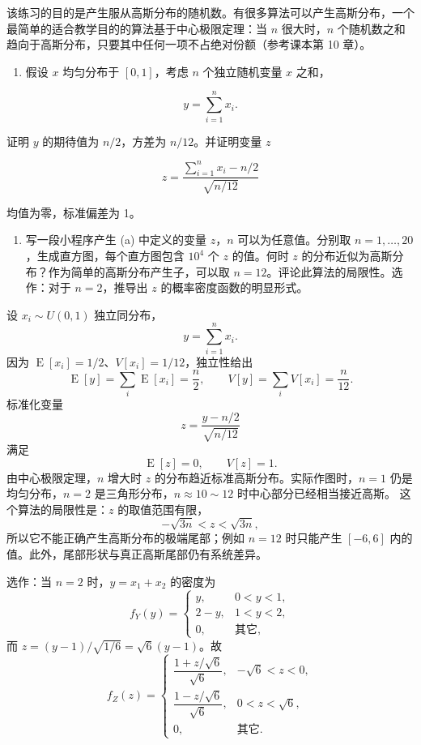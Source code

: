 \begin{question}
该练习的目的是产生服从高斯分布的随机数。有很多算法可以产生高斯分布，一个最简单的适合教学目的的算法基于中心极限定理：当
\(n\) 很大时，\(n\)
个随机数之和趋向于高斯分布，只要其中任何一项不占绝对份额（参考课本第 10
章）。

\begin{enumerate}
\item
  假设 \(x\) 均匀分布于 \([0,1]\)，考虑 \(n\) 个独立随机变量 \(x\)
  之和，
\end{enumerate}

\[
y=\sum_{i=1}^{n}x_i.
\]

证明 \(y\) 的期待值为 \(n/2\)，方差为 \(n/12\)。并证明变量 \(z\)

\[
z=\frac{\sum_{i=1}^{n}x_i-n/2}{\sqrt{n/12}}
\]

均值为零，标准偏差为 1。

\begin{enumerate}[start=2]
\item
  写一段小程序产生 (a) 中定义的变量 \(z\)，\(n\) 可以为任意值。分别取
  \(n=1,\ldots,20\)，生成直方图，每个直方图包含 \(10^4\) 个 \(z\)
  的值。何时 \(z\)
  的分布近似为高斯分布？作为简单的高斯分布产生子，可以取
  \(n=12\)。评论此算法的局限性。选作：对于 \(n=2\)，推导出 \(z\)
  的概率密度函数的明显形式。
\end{enumerate}
\begin{solution}
设 \(x_i\sim U(0,1)\) 独立同分布，
\[
y=\sum_{i=1}^n x_i.
\]
因为 \(\operatorname{E}[x_i]=1/2\)、\(V[x_i]=1/12\)，独立性给出
\[
\operatorname{E}[y]=\sum_i \operatorname{E}[x_i]=\frac n2,
\qquad
V[y]=\sum_i V[x_i]=\frac n{12}.
\]
标准化变量
\[
z=\frac{y-n/2}{\sqrt{n/12}}
\]
满足
\[
\operatorname{E}[z]=0,
\qquad
V[z]=1.
\]
由中心极限定理，\(n\) 增大时 \(z\) 的分布趋近标准高斯分布。实际作图时，\(n=1\)
仍是均匀分布，\(n=2\) 是三角形分布，\(n\approx 10\sim12\) 时中心部分已经相当接近高斯。
这个算法的局限性是：\(z\) 的取值范围有限，
\[
-\sqrt{3n}<z<\sqrt{3n},
\]
所以它不能正确产生高斯分布的极端尾部；例如 \(n=12\) 时只能产生 \([-6,6]\)
内的值。此外，尾部形状与真正高斯尾部仍有系统差异。

选作：当 \(n=2\) 时，\(y=x_1+x_2\) 的密度为
\[
f_Y(y)=
\begin{cases}
y,&0<y<1,\\
2-y,&1<y<2,\\
0,&\text{其它},
\end{cases}
\]
而 \(z=(y-1)/\sqrt{1/6}=\sqrt6(y-1)\)。故
\[
f_Z(z)=
\begin{cases}
\dfrac{1+z/\sqrt6}{\sqrt6},&-\sqrt6<z<0,\\[4pt]
\dfrac{1-z/\sqrt6}{\sqrt6},&0<z<\sqrt6,\\[4pt]
0,&\text{其它}.
\end{cases}
\]
\end{solution}
\end{question}


